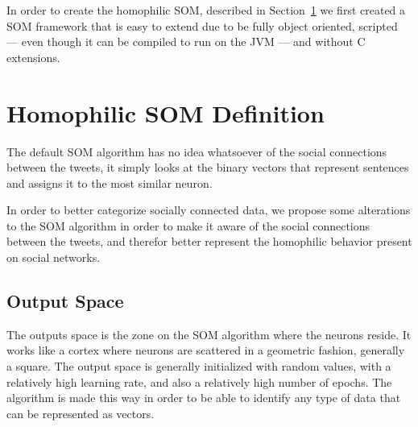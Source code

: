 In order to create the homophilic SOM, described in Section~\ref{sec:algorithm_changes} we first created a SOM framework that is easy to extend due to be fully object oriented, scripted --- even though it can be compiled to run on the JVM --- and without C extensions.



\section{Homophilic SOM Definition}
\label{sec:algorithm_changes}
The default \ac{SOM} algorithm has no idea whatsoever of the social connections between the tweets, it simply looks at the binary vectors that represent sentences and assigns it to the most similar neuron.

In order to better categorize socially connected data, we propose some alterations to the \ac{SOM} algorithm in order to make it aware of the social connections between the tweets, and therefor better represent the homophilic behavior present on social networks.

\subsection{Output Space}
\label{sub:output_space}
The outputs space is the zone on the \ac{SOM} algorithm where the neurons reside. It works like a cortex where neurons are scattered in a geometric fashion, generally a square. The output space is generally initialized with random values, with a relatively high learning rate, and also a relatively high number of epochs. The algorithm is made this way in order to be able to identify any type of data that can be represented as vectors.

